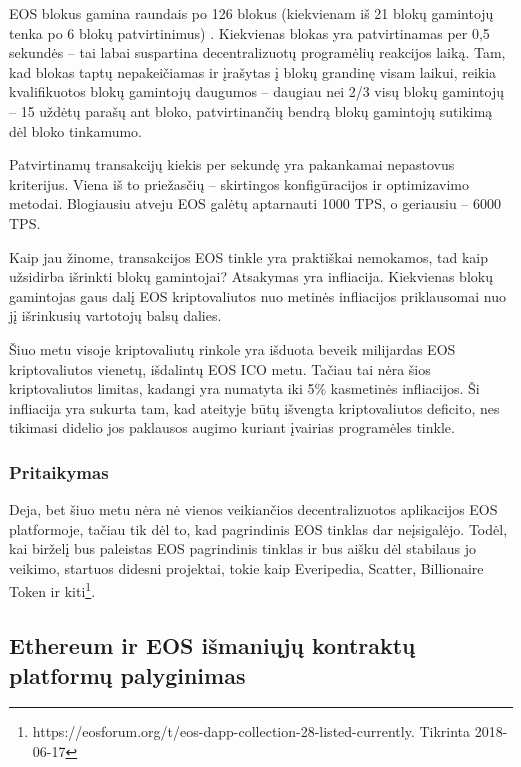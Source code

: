 \documentclass{VUMIFPSkursinis}
\begin{document}
EOS blokus gamina raundais po 126 blokus (kiekvienam iš 21 blokų gamintojų tenka po 6 blokų patvirtinimus) \cite{Cox2018next}. Kiekvienas blokas yra patvirtinamas per 0,5 sekundės – tai labai suspartina decentralizuotų programėlių reakcijos laiką. Tam, kad blokas taptų nepakeičiamas ir įrašytas į blokų grandinę visam laikui, reikia kvalifikuotos blokų gamintojų daugumos – daugiau nei 2/3 visų blokų gamintojų – 15 uždėtų parašų ant bloko, patvirtinančių bendrą blokų gamintojų sutikimą dėl bloko tinkamumo.

Patvirtinamų transakcijų kiekis per sekundę yra pakankamai nepastovus kriterijus. Viena iš to priežasčių – skirtingos konfigūracijos ir optimizavimo metodai. Blogiausiu atveju EOS galėtų aptarnauti 1000 TPS, o geriausiu – 6000 TPS.

Kaip jau žinome, transakcijos EOS tinkle yra praktiškai nemokamos, tad kaip užsidirba išrinkti blokų gamintojai? Atsakymas yra infliacija. Kiekvienas blokų gamintojas gaus dalį EOS kriptovaliutos nuo metinės infliacijos priklausomai nuo jį išrinkusių vartotojų balsų dalies.

Šiuo metu visoje kriptovaliutų rinkole yra išduota beveik milijardas EOS kriptovaliutos vienetų, išdalintų EOS ICO metu. Tačiau tai nėra šios kriptovaliutos limitas, kadangi yra numatyta iki 5\% kasmetinės infliacijos. Ši infliacija yra sukurta tam, kad ateityje būtų išvengta kriptovaliutos deficito, nes tikimasi didelio jos paklausos augimo kuriant įvairias programėles tinkle.

\subsubsection{Pritaikymas}
Deja, bet šiuo metu nėra nė vienos veikiančios decentralizuotos aplikacijos EOS platformoje, tačiau tik dėl to, kad pagrindinis EOS tinklas dar neįsigalėjo. Todėl, kai birželį bus paleistas EOS pagrindinis tinklas ir bus aišku dėl stabilaus jo veikimo, startuos didesni projektai, tokie kaip Everipedia, Scatter, Billionaire Token ir kiti\footnote{https://eosforum.org/t/eos-dapp-collection-28-listed-currently. Tikrinta 2018-06-17}.

\clearpage

\subsection{Ethereum ir EOS išmaniųjų kontraktų platformų palyginimas}
\end{document}
